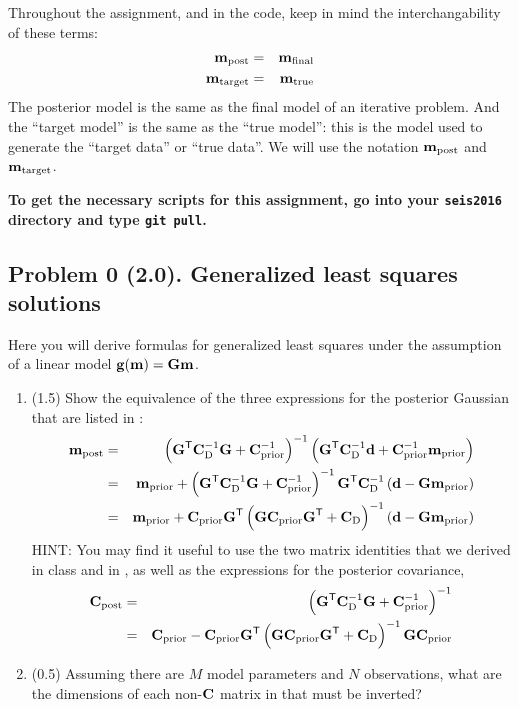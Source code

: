 \documentclass[11pt,titlepage,fleqn]{article}
\begin{document}
Throughout the assignment, and in the code, keep in mind the interchangability of these terms:
%
\begin{eqnarray*}
\mbox{${\bf m}$}_{\rm post} &=& \mbox{${\bf m}$}_{\rm final}
\\
\mbox{${\bf m}$}_{\rm target} &=& \mbox{${\bf m}$}_{\rm true}
\end{eqnarray*}
%
The posterior model is the same as the final model of an iterative problem. And the ``target model'' is the same as the ``true model'': this is the model used to generate the ``target data'' or ``true data''. We will use the notation $\mbox{${\bf m}$}_{\rm post}$ and $\mbox{${\bf m}$}_{\rm target}$.

\bigskip\noindent
{\bf To get the necessary scripts for this assignment, go into your {\tt seis2016} directory and type {\tt git pull}.}


\pagebreak
\subsection*{Problem 0 (2.0). Generalized least squares solutions}

Here you will derive formulas for generalized least squares under the assumption of a linear model $\mbox{${\bf g}$}(\mbox{${\bf m}$}) = \mbox{${\bf G}$}\mbox{${\bf m}$}$.
%
\begin{enumerate}
\item (1.5) Show the equivalence of the three expressions for the posterior Gaussian that are listed in \citet[][p.~66]{Tarantola2005}:
%
\begin{eqnarray}
\mbox{${\bf m}$}_{\rm post} &=& \left(\mbox{${\bf G}$}^{\mathsf{T}} \mbox{${\bf C}$}_{\rm D}^{-1} \mbox{${\bf G}$} + \mbox{${\bf C}$}_{\rm prior}^{-1} \right)^{-1}
\left( \mbox{${\bf G}$}^{\mathsf{T}} \mbox{${\bf C}$}_{\rm D}^{-1} \mbox{${\bf d}$} + \mbox{${\bf C}$}_{\rm prior}^{-1}\mbox{${\bf m}$}_{\rm prior} \right)
\label{mpost1}
\\
&=& \mbox{${\bf m}$}_{\rm prior} + \left(\mbox{${\bf G}$}^{\mathsf{T}} \mbox{${\bf C}$}_{\rm D}^{-1} \mbox{${\bf G}$} + \mbox{${\bf C}$}_{\rm prior}^{-1} \right)^{-1} \mbox{${\bf G}$}^{\mathsf{T}} \mbox{${\bf C}$}_{\rm D}^{-1} \left( \mbox{${\bf d}$} - \mbox{${\bf G}$} \mbox{${\bf m}$}_{\rm prior}\right)
\label{mpost2}
\\
&=& \mbox{${\bf m}$}_{\rm prior} + \mbox{${\bf C}$}_{\rm prior} \mbox{${\bf G}$}^{\mathsf{T}} \left( \mbox{${\bf G}$} \mbox{${\bf C}$}_{\rm prior} \mbox{${\bf G}$}^{\mathsf{T}} + \mbox{${\bf C}$}_{\rm D}\right)^{-1} \left( \mbox{${\bf d}$} - \mbox{${\bf G}$} \mbox{${\bf m}$}_{\rm prior}\right)
\label{mpost3}
\end{eqnarray}
%
HINT: You may find it useful to use the two matrix identities that we derived in class and in \citet[][Eq.~6.525]{Tarantola2005}, as well as the expressions for the posterior covariance,
%
\begin{eqnarray}
\mbox{${\bf C}$}_{\rm post} &=& \left(\mbox{${\bf G}$}^{\mathsf{T}} \mbox{${\bf C}$}_{\rm D}^{-1} \mbox{${\bf G}$} + \mbox{${\bf C}$}_{\rm prior}^{-1} \right)^{-1}
\label{cpost1}
\\
&=& \mbox{${\bf C}$}_{\rm prior} - \mbox{${\bf C}$}_{\rm prior} \mbox{${\bf G}$}^{\mathsf{T}} \left( \mbox{${\bf G}$} \mbox{${\bf C}$}_{\rm prior} \mbox{${\bf G}$}^{\mathsf{T}} + \mbox{${\bf C}$}_{\rm D} \right)^{-1} \mbox{${\bf G}$} \mbox{${\bf C}$}_{\rm prior}
\label{cpost2}
\end{eqnarray}

\item (0.5) Assuming there are $M$ model parameters and $N$ observations, what are the dimensions of each non-$\mbox{${\bf C}$}$ matrix in  that must be inverted?
\end{enumerate}
\end{document}
